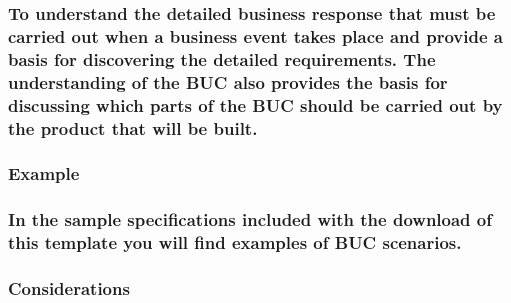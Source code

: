\documentclass[
]{article}
\begin{document}
\hypertarget{to-understand-the-detailed-business-response-that-must-be-carried-out-when-a-business-event-takes-place-and-provide-a-basis-for-discovering-the-detailed-requirements.-the-understanding-of-the-buc-also-provides-the-basis-for-discussing-which-parts-of-the-buc-should-be-carried-out-by-the-product-that-will-be-built.}{%
\subsubsection{To understand the detailed business response that must be
carried out when a business event takes place and provide a basis for
discovering the detailed requirements. The understanding of the BUC also
provides the basis for discussing which parts of the BUC should be
carried out by the product that will be
built.}\label{to-understand-the-detailed-business-response-that-must-be-carried-out-when-a-business-event-takes-place-and-provide-a-basis-for-discovering-the-detailed-requirements.-the-understanding-of-the-buc-also-provides-the-basis-for-discussing-which-parts-of-the-buc-should-be-carried-out-by-the-product-that-will-be-built.}}

\hypertarget{example-1}{%
\subsubsection{Example}\label{example-1}}

\hypertarget{in-the-sample-specifications-included-with-the-download-of-this-template-you-will-find-examples-of-buc-scenarios.}{%
\subsubsection{In the sample specifications included with the download
of this template you will find examples of BUC
scenarios.}\label{in-the-sample-specifications-included-with-the-download-of-this-template-you-will-find-examples-of-buc-scenarios.}}

\hypertarget{considerations-14}{%
\subsubsection{Considerations}\label{considerations-14}}
\end{document}
